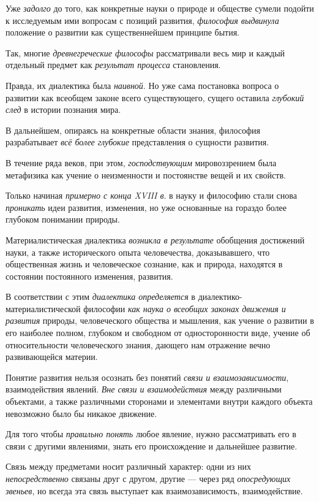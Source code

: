 \documentclass[a4paper,14pt,russian]{extreport}
\begin{document}
Уже \emph{задолго} до того, как конкретные науки о природе и обществе сумели подойти к исследуемым ими вопросам с позиций развития, \emph{философия выдвинула} положение о развитии как существеннейшем принципе бытия.

Так, многие \emph{древнегреческие философы} рассматривали весь мир и каждый отдельный предмет как \emph{результат процесса} становления.

Правда, их диалектика была \emph{наивной}. Но уже сама постановка вопроса о развитии как всеобщем законе всего существующего, сущего оставила \emph{глубокий след} в истории познания мира.

В дальнейшем, опираясь на конкретные области знания, философия разрабатывает \emph{всё более глубокие} представления о сущности развития.

В течение ряда веков, при этом, \emph{господствующим} мировоззрением была метафизика как учение о неизменности и постоянстве вещей и их свойств.

Только начиная \emph{примерно с конца XVIII в}. в науку и философию стали снова \emph{проникать} идеи развития, изменения, но уже основанные на гораздо более глубоком понимании природы.

Материалистическая диалектика \emph{возникла в результате} обобщения достижений науки, а также исторического опыта человечества, доказывавшего, что общественная жизнь и человеческое сознание, как и природа, находятся в состоянии постоянного изменения, развития.

В соответствии с этим \emph{диалектика определяется} в диалектико-материалистической философии \emph{как наука о всеобщих законах движения и развития} природы, человеческого общества и мышления, как учение о развитии в его наиболее полном, глубоком и свободном от односторонности виде, учение об относительности человеческого знания, дающего нам отражение вечно развивающейся материи.

Понятие развития нельзя осознать без понятий \emph{связи и взаимозависимости}, взаимодействия явлений. \emph{Вне связи и взаимодействия} между различными объектами, а также различными сторонами и элементами внутри каждого объекта невозможно было бы никакое движение.

Для того чтобы \emph{правильно понять} любое явление, нужно рассматривать его в связи с другими явлениями, знать его происхождение и дальнейшее развитие.

Связь между предметами носит различный характер: одни из них \emph{непосредственно} связаны друг с другом, другие --- через ряд \emph{опосредующих звеньев}, но всегда эта связь выступает как взаимозависимость, взаимодействие.
\end{document}
